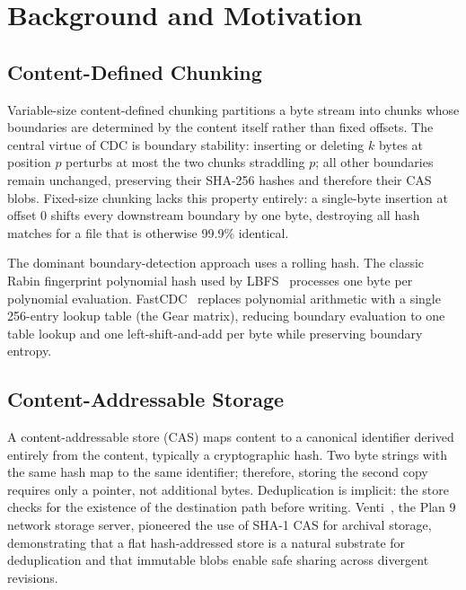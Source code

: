 \documentclass[journal]{IEEEtran}
\begin{document}
\section{Background and Motivation}

\subsection{Content-Defined Chunking}

Variable-size content-defined chunking partitions a byte stream into
chunks whose boundaries are determined by the content itself rather than
fixed offsets.  The central virtue of CDC is boundary stability: inserting
or deleting $k$ bytes at position $p$ perturbs at most the two chunks
straddling $p$; all other boundaries remain unchanged, preserving their
SHA-256 hashes and therefore their CAS blobs.  Fixed-size chunking lacks
this property entirely: a single-byte insertion at offset 0 shifts every
downstream boundary by one byte, destroying all hash matches for a file
that is otherwise 99.9\% identical.

The dominant boundary-detection approach uses a rolling hash.  The classic
Rabin fingerprint polynomial hash used by LBFS~\cite{muthitacharoen2001lbfs}
processes one byte per polynomial evaluation.  FastCDC~\cite{xia2016fastcdc}
replaces polynomial arithmetic with a single 256-entry lookup table (the
Gear matrix), reducing boundary evaluation to one table lookup and one
left-shift-and-add per byte while preserving boundary entropy.

\subsection{Content-Addressable Storage}

A content-addressable store (CAS) maps content to a canonical identifier
derived entirely from the content, typically a cryptographic hash.  Two
byte strings with the same hash map to the same identifier; therefore,
storing the second copy requires only a pointer, not additional bytes.
Deduplication is implicit: the store checks for the existence of the
destination path before writing.  Venti~\cite{quinlan2002venti}, the Plan
9 network storage server, pioneered the use of SHA-1 CAS for archival
storage, demonstrating that a flat hash-addressed store is a natural
substrate for deduplication and that immutable blobs enable safe sharing
across divergent revisions.
\end{document}
